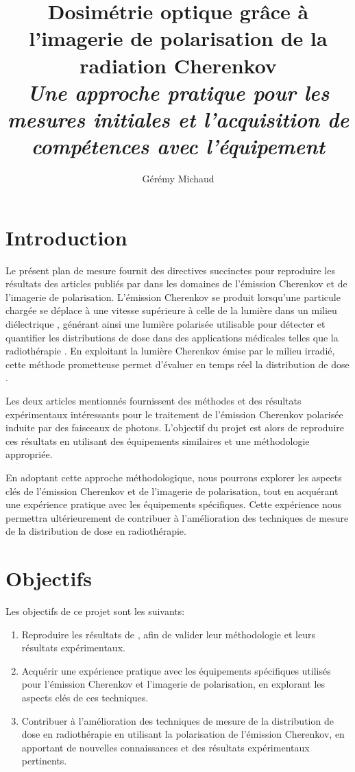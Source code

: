 \documentclass{Thesis}
\title{Dosimétrie optique grâce à l'imagerie de polarisation de la radiation Cherenkov
\\\Large{\textit{Une approche pratique pour les mesures initiales et l'acquisition de compétences avec l'équipement}}}
\author{Gérémy Michaud}{G. Michaud}
\begin{document}
\section*{Introduction}
Le présent plan de mesure fournit des directives succinctes pour reproduire les
résultats des articles publiés par  \cite{cloutierAccurateDoseMeasurements2022, cloutierDirectInwaterRadiation2022}
dans les domaines de l'émission Cherenkov et de l'imagerie de polarisation.
L'émission Cherenkov se produit lorsqu'une particule chargée se déplace à une vitesse supérieure à celle de la lumière
dans un milieu diélectrique \cite{cerenkovVisibleRadiationProduced1937},
générant ainsi une lumière polarisée utilisable pour détecter et quantifier les distributions de dose dans des applications médicales telles que la radiothérapie \cite{ashrafDosimetryFLASHRadiotherapy2020}.
En exploitant la lumière Cherenkov émise par le milieu irradié, cette méthode prometteuse permet d'évaluer en temps réel la distribution de dose \cite{jarvisCherenkovVideoImaging2014}.

Les deux articles mentionnés fournissent des méthodes et des résultats expérimentaux
intéressants pour le traitement de l'émission Cherenkov polarisée induite par des faisceaux de photons.
L'objectif du projet est alors de reproduire ces résultats en utilisant des équipements similaires et une méthodologie appropriée.

En adoptant cette approche méthodologique, nous pourrons explorer les aspects clés de
l'émission Cherenkov et de l'imagerie de polarisation, tout en acquérant une expérience
pratique avec les équipements spécifiques. Cette expérience nous permettra ultérieurement de contribuer
à l'amélioration des techniques de mesure de la distribution de dose en radiothérapie.

\section*{Objectifs}
Les objectifs de ce projet sont les suivants:
\begin{enumerate}
    \setlength\itemsep{1mm}
    \item Reproduire les résultats de , afin de valider leur méthodologie et leurs résultats expérimentaux.
    \item Acquérir une expérience pratique avec les équipements spécifiques utilisés pour l'émission Cherenkov et l'imagerie de polarisation, en explorant les aspects clés de ces techniques.
    \item Contribuer à l'amélioration des techniques de mesure de la distribution de dose en radiothérapie en utilisant la polarisation de l'émission Cherenkov, en apportant de nouvelles connaissances et des résultats expérimentaux pertinents.
\end{enumerate}
\end{document}
